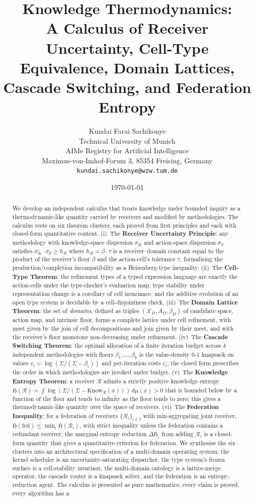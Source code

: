 \documentclass[twocolumn,11pt,a4paper]{article}
\title{\textbf{Knowledge Thermodynamics:\\[3pt]
A Calculus of Receiver Uncertainty, Cell-Type Equivalence, Domain Lattices,\\[2pt]
Cascade Switching, and Federation Entropy}}
\author{Kundai Farai Sachikonye\\
Technical University of Munich\\
AIMe Registry for Artificial Intelligence\\
Maximus-von-Imhof-Forum 3, 85354 Freising, Germany\\
\texttt{kundai.sachikonye@wzw.tum.de}}
\date{\today}
\newcommand{\Cands}{\mathcal{X}}
\newcommand{\receiver}{\mathcal{R}}
\newcommand{\Sigmax}{\Sigma}
\newcommand{\hbarR}{\hbar_{\receiver}}
\newcommand{\disp}{\sigma}
\newcommand{\Know}{\mathrm{Know}}
\newcommand{\Hknow}{\mathfrak{H}}
\begin{document}
\maketitle

\begin{abstract}
We develop an independent calculus that treats knowledge under bounded inquiry as a thermodynamic-like quantity carried by receivers and modified by methodologies. The calculus rests on six theorem clusters, each proved from first principles and each with closed-form quantitative content. (i)~The \textbf{Receiver Uncertainty Principle}: any methodology with knowledge-space dispersion $\disp_K$ and action-space dispersion $\disp_Y$ satisfies $\disp_K \cdot \disp_Y \geq \hbarR$ where $\hbarR = \beta \cdot \tau$ is a receiver--domain constant equal to the product of the receiver's floor $\beta$ and the action-cell's tolerance $\tau$, formalising the production/completion incompatibility as a Heisenberg-type inequality. (ii)~The \textbf{Cell-Type Theorem}: the refinement types of a typed expression language are exactly the action-cells under the type-checker's evaluation map; type stability under representation change is a corollary of cell invariance, and the additive evolution of an open type system is decidable by a cell-disjointness check. (iii)~The \textbf{Domain Lattice Theorem}: the set of \emph{domains}, defined as triples $(\Cands_D, A_D, \beta_D)$ of candidate space, action map, and intrinsic floor, forms a complete lattice under cell refinement, with meet given by the join of cell decompositions and join given by their meet, and with the receiver's floor monotone non-decreasing under refinement. (iv)~The \textbf{Cascade Switching Theorem}: the optimal allocation of a finite iteration budget across $k$ independent methodologies with floors $\beta_1, \ldots, \beta_k$ is the value-density 0-1 knapsack on values $v_i = \log(\Sigmax/(\Sigmax-\beta_i))$ and per-iteration costs $c_i$; the closed form prescribes the order in which methodologies are invoked under budget. (v)~The \textbf{Knowledge Entropy Theorem}: a receiver $\receiver$ admits a strictly positive knowledge entropy $\Hknow(\receiver) = \int \log(\Sigmax/(\Sigmax - \Know_\receiver(x))) \, d\mu(x) > 0$ that is bounded below by a function of the floor and tends to infinity as the floor tends to zero; this gives a thermodynamic-like quantity over the space of receivers. (vi)~The \textbf{Federation Inequality}: for a federation of receivers $\{\receiver_i\}_{i \in I}$ with min-aggregating joint receiver, $\Hknow(\mathrm{fed}) \leq \min_i \Hknow(\receiver_i)$, with strict inequality unless the federation contains a redundant receiver; the marginal entropy reduction $\Delta\Hknow_i$ from adding $\receiver_i$ is a closed-form quantity that gives a quantitative criterion for federation. We synthesise the six clusters into an architectural specification of a multi-domain operating system: the kernel scheduler is an uncertainty-saturating dispatcher, the type system's frozen surface is a cell-stability invariant, the multi-domain ontology is a lattice-merge operator, the cascade router is a knapsack solver, and the federation is an entropy-reduction agent. The calculus is presented as pure mathematics; every claim is proved, every algorithm has a 
\end{abstract}
\end{document}
